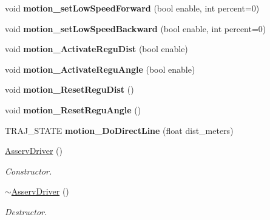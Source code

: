 \begin{DoxyCompactItemize}
void {\bfseries motion\+\_\+set\+Low\+Speed\+Forward} (bool enable, int percent=0)
\item 
\mbox{\label{classAsservDriver_a713b553740e59136151e2c6886187713}} 
void {\bfseries motion\+\_\+set\+Low\+Speed\+Backward} (bool enable, int percent=0)
\item 
\mbox{\label{classAsservDriver_a48e4f69bf857d6a18098dc48615a61f1}} 
void {\bfseries motion\+\_\+\+Activate\+Regu\+Dist} (bool enable)
\item 
\mbox{\label{classAsservDriver_a846608b8033f7d592d2540b68de72eeb}} 
void {\bfseries motion\+\_\+\+Activate\+Regu\+Angle} (bool enable)
\item 
\mbox{\label{classAsservDriver_acb84d282c7e0b40d9b326b0fcb7a0c69}} 
void {\bfseries motion\+\_\+\+Reset\+Regu\+Dist} ()
\item 
\mbox{\label{classAsservDriver_acd102376cacdf0fc40a587f25359a25e}} 
void {\bfseries motion\+\_\+\+Reset\+Regu\+Angle} ()
\item 
\mbox{\label{classAsservDriver_a27f3a8fa56cc689d072a39efb1ed20b3}} 
T\+R\+A\+J\+\_\+\+S\+T\+A\+TE {\bfseries motion\+\_\+\+Do\+Direct\+Line} (float dist\+\_\+meters)
\item 
\mbox{\label{classAsservDriver_a70982198e21af96e5d4faa6ce9b0608c}} 
\hyperlink{classAsservDriver_a70982198e21af96e5d4faa6ce9b0608c}{Asserv\+Driver} ()
\begin{DoxyCompactList}\small\item\em Constructor. \end{DoxyCompactList}\item 
\mbox{\label{classAsservDriver_a5960b3ced1e727d33ded6ff469fc1a78}} 
\hyperlink{classAsservDriver_a5960b3ced1e727d33ded6ff469fc1a78}{$\sim$\+Asserv\+Driver} ()
\begin{DoxyCompactList}\small\item\em Destructor. \end{DoxyCompactList}\item 
\mbox{\label{classAsservDriver_a636bf5413d2cf0419f188a4965340758}} 

\end{DoxyCompactItemize}
